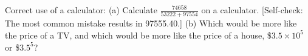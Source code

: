 Correct use of a calculator: (a) Calculate $\frac{74658}{53222+97554}$ on a calculator.
[Self-check: The most common mistake results in 97555.40.] \answercheck\hwendpart
(b) Which would be more like the price of a TV, and which
would be more like the price of a house, \$$3.5\times10^5$  or \$$3.5^5$?
